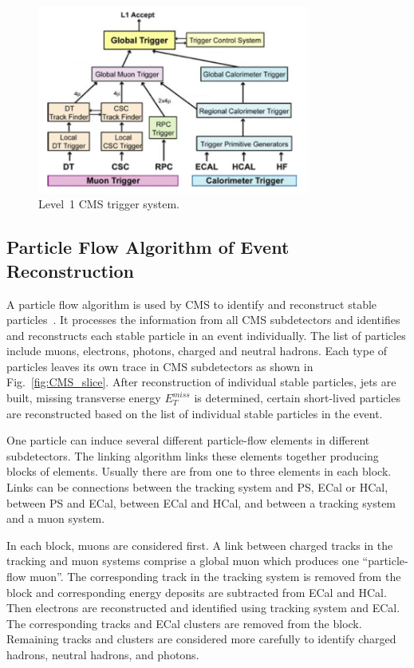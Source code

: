\begin{figure}[htb]
  \begin{center}
    \includegraphics[width=0.8\textwidth]{../figs/Exp/trigger_L1.png}
    \caption{Level~1 CMS trigger system.}
    \label{fig:trigger_L1}
  \end{center}
\end{figure}

\subsection{Particle Flow Algorithm of Event Reconstruction}

A particle flow algorithm is used by CMS to identify and reconstruct stable particles~\cite{ref_ParticleFlowAlg}. It processes the information from all CMS subdetectors and identifies and reconstructs each stable particle in an event individually. The list of particles include muons, electrons, photons, charged and neutral hadrons. Each type of particles leaves its own trace in CMS subdetectors as shown in Fig.~\ref{fig:CMS_slice}. After reconstruction of individual stable particles, jets are built, missing transverse energy $E_T^{miss}$ is determined, certain short-lived particles are reconstructed based on the list of individual stable particles in the event.

One particle can induce several different particle-flow elements in different subdetectors. The linking algorithm links these elements together producing blocks of elements. Usually there are from one to three elements in each block. Links can be connections between the tracking system and PS, ECal or HCal, between PS and ECal, between ECal and HCal, and between a tracking system and a muon system. 

In each block, muons are considered first. A link between charged tracks in the tracking and muon systems comprise a global muon which produces one ``particle-flow muon''. The corresponding track in the tracking system is removed from the block and corresponding energy deposits are subtracted from ECal and HCal. Then electrons are reconstructed and identified using tracking system and ECal. The corresponding tracks and ECal clusters are removed from the block. Remaining tracks and clusters are considered more carefully to identify charged hadrons, neutral hadrons, and photons.

